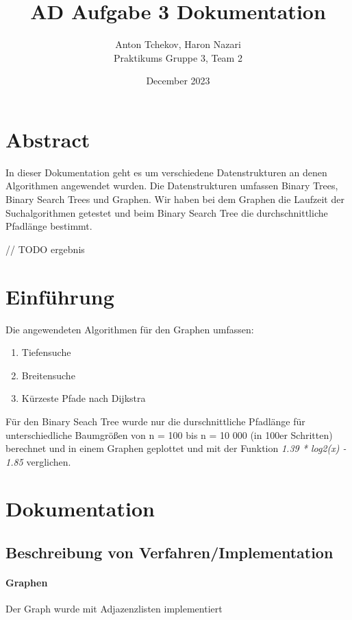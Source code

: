 \documentclass[utf8]{article}
\title{AD Aufgabe 3 Dokumentation}
\author{Anton Tchekov, Haron Nazari\\ Praktikums Gruppe 3, Team 2}
\date{December 2023}
\begin{document}
\maketitle

\section{Abstract}
In dieser Dokumentation geht es um verschiedene Datenstrukturen an denen 
Algorithmen angewendet wurden.
Die Datenstrukturen umfassen Binary Trees, Binary Search Trees und Graphen.
Wir haben bei dem Graphen die Laufzeit der Suchalgorithmen getestet und
beim Binary Search Tree die durchschnittliche Pfadlänge bestimmt.

// TODO ergebnis

\section{Einführung}
Die angewendeten Algorithmen für den Graphen umfassen: 
\begin{enumerate}
  \item Tiefensuche
  \item Breitensuche
  \item Kürzeste Pfade nach Dijkstra
\end{enumerate}
Für den Binary Seach Tree wurde nur die durschnittliche Pfadlänge für
unterschiedliche Baumgrößen von n = 100 bis n = 10 000 (in 100er Schritten) 
berechnet und in einem Graphen geplottet und mit der
Funktion \emph{1.39 * log2(x) - 1.85} verglichen.
\pagebreak
\section{Dokumentation}

\subsection{Beschreibung von Verfahren/Implementation}

\paragraph{Graphen}
Der Graph wurde mit Adjazenzlisten implementiert
\end{document}
